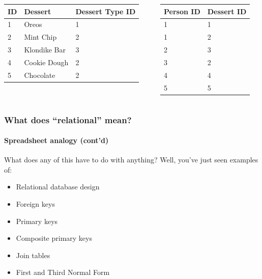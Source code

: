 \documentclass[aspectratio=169]{beamer}
\begin{document}
\begin{frame}
  \begin{columns}[T]
    \begin{column}{0.3\textwidth}
      \begin{table}[]
        \footnotesize
        \begin{tabular}{@{}llp{5em}@{}}
          \toprule
          ID & Dessert      & Dessert Type ID \\ \midrule
          1  & Oreos        & 1               \\
          2  & Mint Chip    & 2               \\
          3  & Klondike Bar & 3               \\
          4  & Cookie Dough & 2               \\
          5  & Chocolate    & 2               \\ \bottomrule
        \end{tabular}
      \end{table}
    \end{column}
    \begin{column}{0.5\textwidth}
      \begin{table}[]
        \footnotesize
        \begin{tabular}{@{}ll@{}}
          \toprule
          Person ID & Dessert ID \\ \midrule
          1         & 1          \\
          1         & 2          \\
          2         & 3          \\
          3         & 2          \\
          4         & 4          \\
          5         & 5          \\ \bottomrule
        \end{tabular}
      \end{table}
    \end{column}
  \end{columns}
\end{frame}

\begin{frame}
  \frametitle{What does ``relational'' mean?}
  \framesubtitle{Spreadsheet analogy (cont'd)}

  What does any of this have to do with anything? Well, you've just seen
  examples of:

  \begin{itemize}
    \item Relational database design
    \item Foreign keys
    \item Primary keys
    \item Composite primary keys
    \item Join tables
    \item First and Third Normal Form
  \end{itemize}
\end{frame}
\end{document}
